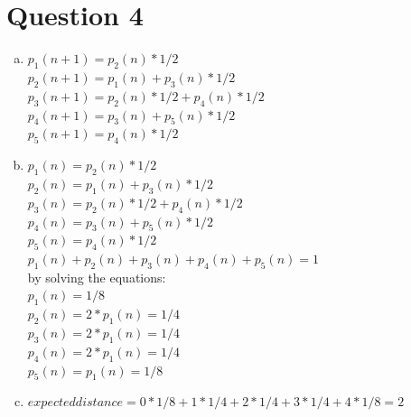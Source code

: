 \documentclass[11pt, a4paper]{article}
\begin{document}
\section*{Question 4}
\begin{enumerate}[(a)]
    \item
        $ p_1(n+1) = p_2(n) * 1/2$\\
        $ p_2(n+1) = p_1(n) + p_3(n) * 1/2$\\
        $ p_3(n+1) = p_2(n) * 1/2 + p_4(n) * 1/2$\\
        $ p_4(n+1) = p_3(n) + p_5(n) * 1/2$\\
        $ p_5(n+1) = p_4(n) * 1/2$
    \item
        $ p_1(n) = p_2(n) * 1/2$\\
        $ p_2(n) = p_1(n) + p_3(n) * 1/2$\\
        $ p_3(n) = p_2(n) * 1/2 + p_4(n) * 1/2$\\
        $ p_4(n) = p_3(n) + p_5(n) * 1/2$\\
        $ p_5(n) = p_4(n) * 1/2$\\
        $  p_1(n) +  p_2(n) +  p_3(n) +  p_4(n) +  p_5(n) = 1$\\
        by solving the equations:\\
        $ p_1(n) = 1/8 $\\
        $ p_2(n) = 2 * p_1(n) = 1/4 $\\
        $ p_3(n) = 2 * p_1(n) = 1/4 $\\
        $ p_4(n) = 2 * p_1(n) = 1/4 $\\
        $ p_5(n) = p_1(n) = 1/8 $
    \item
        $ expected distance = 0 * 1/8 + 1 * 1/4 + 2 * 1/4 + 3 * 1/4 + 4 * 1/8 = 2$
\end{enumerate}
\end{document}
